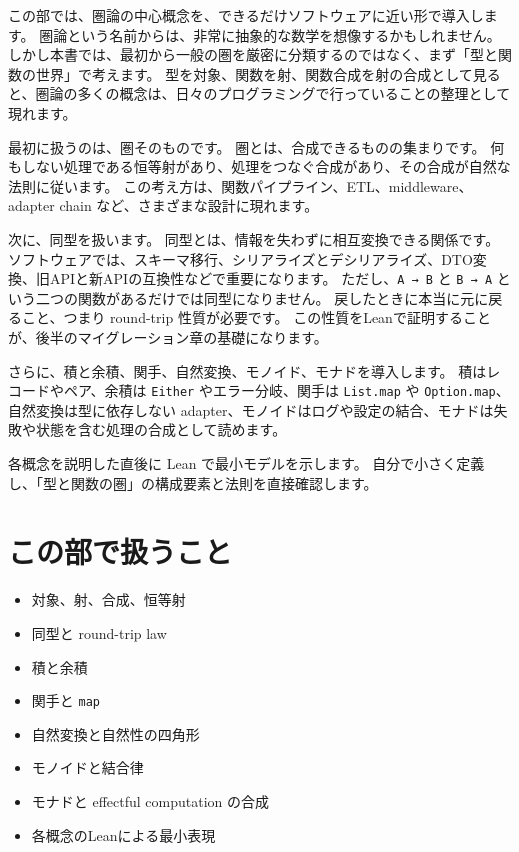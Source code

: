
この部では、圏論の中心概念を、できるだけソフトウェアに近い形で導入します。
圏論という名前からは、非常に抽象的な数学を想像するかもしれません。
しかし本書では、最初から一般の圏を厳密に分類するのではなく、まず「型と関数の世界」で考えます。
型を対象、関数を射、関数合成を射の合成として見ると、圏論の多くの概念は、日々のプログラミングで行っていることの整理として現れます。

最初に扱うのは、圏そのものです。
圏とは、合成できるものの集まりです。
何もしない処理である恒等射があり、処理をつなぐ合成があり、その合成が自然な法則に従います。
この考え方は、関数パイプライン、ETL、middleware、adapter chain など、さまざまな設計に現れます。

次に、同型を扱います。
同型とは、情報を失わずに相互変換できる関係です。
ソフトウェアでは、スキーマ移行、シリアライズとデシリアライズ、DTO変換、旧APIと新APIの互換性などで重要になります。
ただし、\texttt{A → B} と \texttt{B → A} という二つの関数があるだけでは同型になりません。
戻したときに本当に元に戻ること、つまり round-trip 性質が必要です。
この性質をLeanで証明することが、後半のマイグレーション章の基礎になります。

さらに、積と余積、関手、自然変換、モノイド、モナドを導入します。
積はレコードやペア、余積は \texttt{Either} やエラー分岐、関手は \texttt{List.map} や \texttt{Option.map}、自然変換は型に依存しない adapter、モノイドはログや設定の結合、モナドは失敗や状態を含む処理の合成として読めます。

各概念を説明した直後に Lean で最小モデルを示します。
自分で小さく定義し、「型と関数の圏」の構成要素と法則を直接確認します。

\section*{この部で扱うこと}

\begin{itemize}
\item 対象、射、合成、恒等射
\item 同型と round-trip law
\item 積と余積
\item 関手と \texttt{map}
\item 自然変換と自然性の四角形
\item モノイドと結合律
\item モナドと effectful computation の合成
\item 各概念のLeanによる最小表現
\end{itemize}
